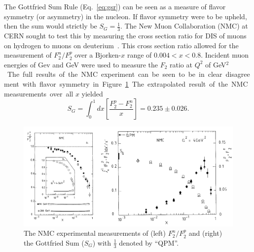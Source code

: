 The Gottfried Sum Rule (Eq.~\ref{eq:gsr}) can be seen as a measure of flavor symmetry (or asymmetry) in the nucleon. If flavor symmetry were to be upheld, then the sum would strictly be $S_G = \frac{1}{3}$. The New Muon Collaboration (NMC) at CERN sought to test this by measuring the cross section ratio for DIS of muons on hydrogen to muons on deuterium~\cite{Amaudruz:1991nw,Arneodo:1994sh}. This cross section ratio allowed for the measurement of $F_2^n/F_2^p$ over a Bjorken-$x$ range of $0.004 < x < 0.8$.  Incident muon energies of \unit[90]{Gev} and \unit[280]{GeV} were used to measure the $F_2$ ratio at $Q^2$ of \unit[4]{GeV$^2$}. The full results of the NMC experiment can be seen to be in clear disagreement with flavor symmetry in Figure~\ref{fig:nmc}. The extrapolated result of the NMC measurements over all $x$ yielded
\begin{equation}
S_G = \int_0^1 dx \left[ \frac{F_2^p - F_2^n}{x} \right] = 0.235 \pm 0.026.
\end{equation}

\begin{figure}
	\centering
	\includegraphics[width=\textwidth]{figures/background/NMC-All.pdf}
	\caption{The NMC experimental measurements of (left) $F_2^n/F_2^p$ and (right) the Gottfried Sum ($S_G$) with $\frac{1}{3}$ denoted by ``QPM''.}
	\label{fig:nmc}
\end{figure}

